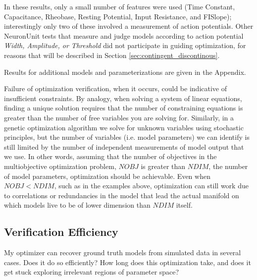 In these results, only a small number of features were used (Time Constant, Capacitance, Rheobase, Resting Potential, Input Resistance, and FISlope); interestingly only two of these involved a measurement of action potentials.
Other NeuronUnit tests that measure and judge models according to action potential \emph{Width, Amplitude, or Threshold} did not participate in guiding optimization, for reasons that will be described in Section \ref{sec:contingent_discontinous}.


Results for additional models and parameterizations are given in the Appendix.

Failure of optimization verification, when it occurs, could be indicative of insufficient constraints.
By analogy, when solving a system of linear equations, finding a unique solution requires that the number of constraining equations is greater than the number of free variables you are solving for.
Similarly, in a genetic optimization algorithm we solve for unknown variables using stochastic principles, but the number of variables (i.e. model parameters) we can identify is still limited by the number of independent measurements of model output that we use.
In other words, assuming that the number of objectives in the multiobjective optimization problem, $NOBJ$ is greater than $NDIM$, the number of model parameters, optimization should be achievable.
Even when $NOBJ<NDIM$, such as in the examples above, optimization can still work due to correlations or redundancies in the model that lead the actual manifold on which models live to be of lower dimension than $NDIM$ itself.

\subsection{Verification Efficiency}
My optimizer can recover ground truth models from simulated data in several cases.
Does it do so efficiently?
How long does this optimization take, and does it get stuck exploring irrelevant regions of parameter space?

